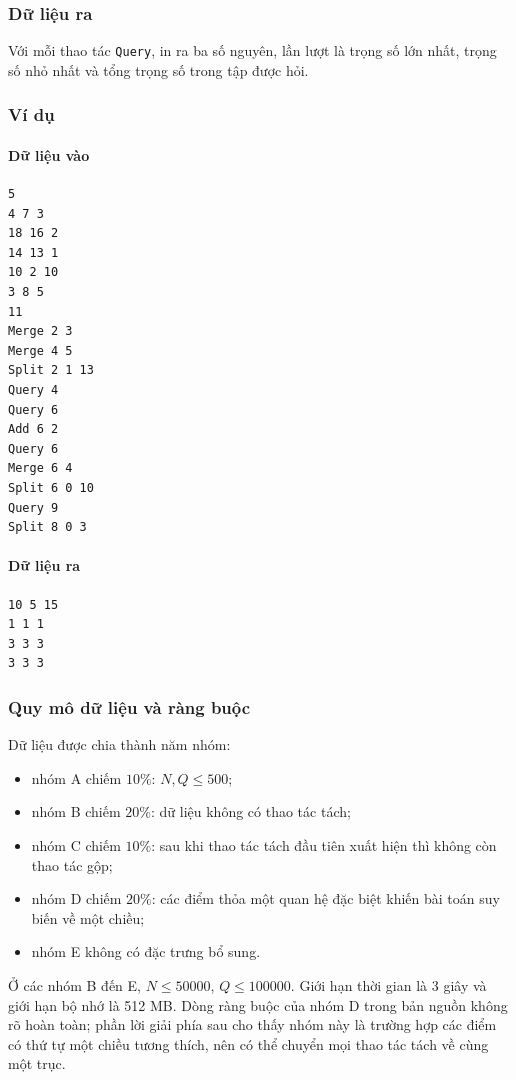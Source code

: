 \documentclass[11pt]{article}
\begin{document}
\subsubsection{Dữ liệu ra}

Với mỗi thao tác \texttt{Query}, in ra ba số nguyên, lần lượt là trọng số lớn
nhất, trọng số nhỏ nhất và tổng trọng số trong tập được hỏi.

\subsubsection{Ví dụ}

\paragraph{Dữ liệu vào}
\begin{verbatim}
5
4 7 3
18 16 2
14 13 1
10 2 10
3 8 5
11
Merge 2 3
Merge 4 5
Split 2 1 13
Query 4
Query 6
Add 6 2
Query 6
Merge 6 4
Split 6 0 10
Query 9
Split 8 0 3
\end{verbatim}

\paragraph{Dữ liệu ra}
\begin{verbatim}
10 5 15
1 1 1
3 3 3
3 3 3
\end{verbatim}

\subsubsection{Quy mô dữ liệu và ràng buộc}

Dữ liệu được chia thành năm nhóm:
\begin{itemize}
  \item nhóm A chiếm \(10\%\): \(N,Q\le 500\);
  \item nhóm B chiếm \(20\%\): dữ liệu không có thao tác tách;
  \item nhóm C chiếm \(10\%\): sau khi thao tác tách đầu tiên xuất hiện thì
  không còn thao tác gộp;
  \item nhóm D chiếm \(20\%\): các điểm thỏa một quan hệ đặc biệt khiến bài
  toán suy biến về một chiều;
  \item nhóm E không có đặc trưng bổ sung.
\end{itemize}

Ở các nhóm B đến E, \(N\le 50000\), \(Q\le 100000\). Giới hạn thời gian là
3 giây và giới hạn bộ nhớ là 512 MB. Dòng ràng buộc của nhóm D trong bản nguồn
không rõ hoàn toàn; phần lời giải phía sau cho thấy nhóm này là trường hợp các
điểm có thứ tự một chiều tương thích, nên có thể chuyển mọi thao tác tách về
cùng một trục.
\end{document}
